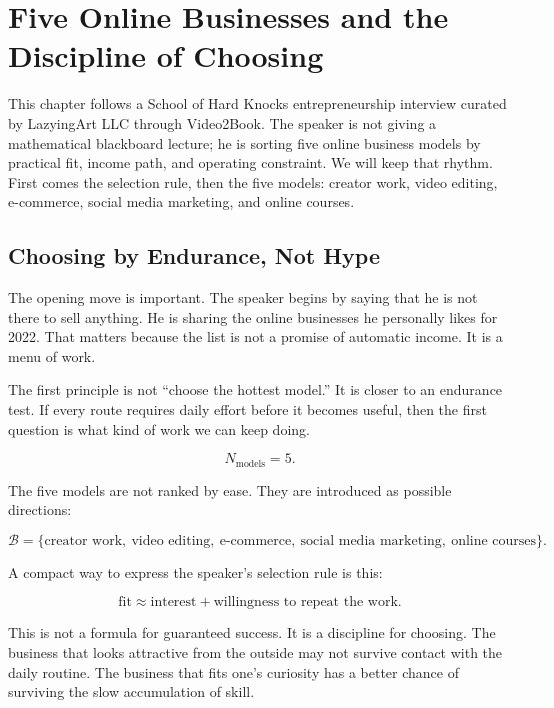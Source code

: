 \chapter{Five Online Businesses and the Discipline of Choosing}

This chapter follows a School of Hard Knocks entrepreneurship interview curated by LazyingArt LLC through Video2Book. The speaker is not giving a mathematical blackboard lecture; he is sorting five online business models by practical fit, income path, and operating constraint. We will keep that rhythm. First comes the selection rule, then the five models: creator work, video editing, e-commerce, social media marketing, and online courses.

\section{Choosing by Endurance, Not Hype}

The opening move is important. The speaker begins by saying that he is not there to sell anything. He is sharing the online businesses he personally likes for 2022. That matters because the list is not a promise of automatic income. It is a menu of work.

The first principle is not ``choose the hottest model.'' It is closer to an endurance test. If every route requires daily effort before it becomes useful, then the first question is what kind of work we can keep doing.

\begin{equation}
N_{\mathrm{models}} = 5.
\end{equation}

The five models are not ranked by ease. They are introduced as possible directions:

\begin{equation}
\mathcal{B}
=
\{\text{creator work},\ \text{video editing},\ \text{e-commerce},\ \text{social media marketing},\ \text{online courses}\}.
\end{equation}

A compact way to express the speaker's selection rule is this:

\begin{equation}
\text{fit}
\approx
\text{interest}
+
\text{willingness to repeat the work}.
\end{equation}

This is not a formula for guaranteed success. It is a discipline for choosing. The business that looks attractive from the outside may not survive contact with the daily routine. The business that fits one's curiosity has a better chance of surviving the slow accumulation of skill.

